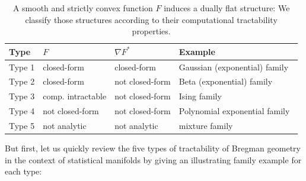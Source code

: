\documentclass[graybox]{svmult}
\begin{document}
\begin{table}
\centering
\begin{tabular}{|l||l|l|l|}\hline
Type & $F$ & $\nabla F^*$ & Example\\ \hline\hline
Type 1 & closed-form & closed-form & Gaussian (exponential) family \\
Type 2 & closed-form & not closed-form & Beta (exponential) family\\
Type 3 & comp. intractable &  not closed-form &  Ising family~\cite{BMFamily-2013} \\
Type 4 & not closed-form & not closed-form & Polynomial exponential family~\cite{PEF-2016}\\
Type 5 & not analytic & not analytic &  mixture family \\ \hline
\end{tabular}

\caption{A smooth and strictly convex function $F$ induces a dually flat structure: 
We classify those structures according to their computational tractability properties.\label{tab:level}}

\end{table}
 


But first, let us quickly review the five types of tractability  of Bregman geometry in the context of statistical manifolds by giving an illustrating family example for each type:
 
\end{document}
